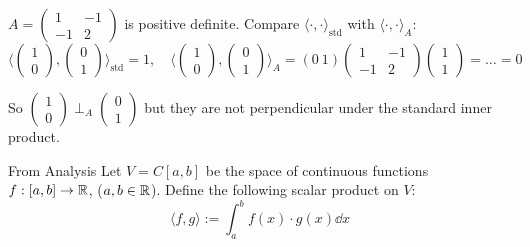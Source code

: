 \documentclass[12pt]{article}
\begin{document}
\begin{example}{}{}
    $A = \begin{pmatrix}
        1 & -1 \\
        -1 & 2
    \end{pmatrix}$ is positive definite. Compare $\langle \cdot, \cdot \rangle_{\text{std}}$ with $\langle \cdot, \cdot \rangle_A$:
    $$
        \langle \begin{pmatrix} 1 \\ 0 \end{pmatrix}, \begin{pmatrix} 0 \\ 1 \end{pmatrix} \rangle_{\text{std}} = 1, \quad \langle \begin{pmatrix} 1 \\ 0 \end{pmatrix}, \begin{pmatrix} 0 \\ 1 \end{pmatrix} \rangle_A = (0 \ 1) \begin{pmatrix}
        1 & -1 \\
        -1 & 2
    \end{pmatrix} \begin{pmatrix} 1 \\ 1 \end{pmatrix} = \dots = 0
    $$

    So $\begin{pmatrix} 1 \\ 0 \end{pmatrix} \perp_A \begin{pmatrix} 0 \\ 1 \end{pmatrix}$ but they are not perpendicular under the standard inner product.
\end{example}

\begin{example}{From Analysis}{}
    Let $V = C[a, b]$ be the space of continuous functions $f: [a, b] \rightarrow \mathbb{R}$, ($a, b \in \mathbb{R}$). Define the following scalar product on $V$:
    $$
        \langle f, g \rangle := \int_{a}^{b} f(x) \cdot g(x) \dd x
    $$
\end{example}
\end{document}
